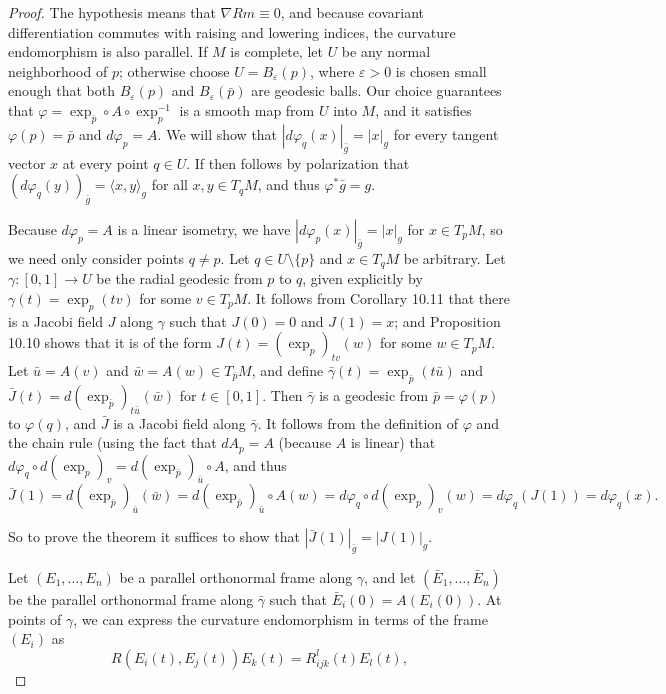 \begin{proof}
The hypothesis means that $\nabla Rm \equiv 0$, and because covariant differentiation commutes with raising and lowering indices, the curvature endomorphism is also parallel. If $M$ is complete, let $U$ be any normal neighborhood of $p$; otherwise choose $U = B_\varepsilon(p)$, where $\varepsilon > 0$ is chosen small enough that both $B_\varepsilon(p)$ and $B_\varepsilon(\bar{p})$ are geodesic balls. Our choice guarantees that $\varphi = \exp_{\bar{p}} \circ A \circ \exp_p^{-1}$ is a smooth map from $U$ into $M$, and it satisfies $\varphi(p) = \bar{p}$ and $d\varphi_p = A$. We will show that $|d\varphi_q(x)|_{\bar{g}} = |x|_g$ for every tangent vector $x$ at every point $q \in U$. If then follows by polarization that $(d\varphi_q(y))_{\bar{g}} = \langle x, y \rangle_g$ for all $x, y \in T_q M$, and thus $\varphi^* \bar{g} = g$.

Because $d\varphi_p = A$ is a linear isometry, we have $|d\varphi_p(x)|_{\bar{g}} = |x|_g$ for $x \in T_p M$, so we need only consider points $q \neq p$. Let $q \in U \setminus \{p\}$ and $x \in T_q M$ be arbitrary. Let $\gamma : [0, 1] \to U$ be the radial geodesic from $p$ to $q$, given explicitly by $\gamma(t) = \exp_p(tv)$ for some $v \in T_p M$. It follows from Corollary 10.11 that there is a Jacobi field $J$ along $\gamma$ such that $J(0) = 0$ and $J(1) = x$; and Proposition 10.10 shows that it is of the form $J(t) = (\exp_p)_{tv}(w)$ for some $w \in T_p M$. Let $\bar{u} = A(v)$ and $\bar{w} = A(w) \in T_{\bar{p}} M$, and define $\bar{\gamma}(t) = \exp_{\bar{p}}(t\bar{u})$ and $\bar{J}(t) = d(\exp_{\bar{p}})_{t\bar{u}}(\bar{w})$ for $t \in [0, 1]$. Then $\bar{\gamma}$ is a geodesic from $\bar{p} = \varphi(p)$ to $\varphi(q)$, and $\bar{J}$ is a Jacobi field along $\bar{\gamma}$. It follows from the definition of $\varphi$ and the chain rule (using the fact that $dA_p = A$ (because $A$ is linear) that $d\varphi_q \circ d(\exp_p)_v = d(\exp_{\bar{p}})_{\bar{u}} \circ A$, and thus
\[
\bar{J}(1) = d(\exp_{\bar{p}})_{\bar{u}}(\bar{w}) = d(\exp_{\bar{p}})_{\bar{u}} \circ A(w) = d\varphi_q \circ d(\exp_p)_v(w) = d\varphi_q(J(1)) = d\varphi_q(x).
\]

So to prove the theorem it suffices to show that $|\bar{J}(1)|_{\bar{g}} = |J(1)|_g$.

Let $(E_1,\ldots,E_n)$ be a parallel orthonormal frame along $\gamma$, and let $(\bar{E}_1,\ldots,\bar{E}_n)$ be the parallel orthonormal frame along $\bar{\gamma}$ such that $\bar{E}_i(0) = A(E_i(0))$. At points of $\gamma$, we can express the curvature endomorphism in terms of the frame $(E_i)$ as
\[
R(E_i(t), E_j(t))E_k(t) = R_{ijk}^l(t) E_l(t),
\]


\end{proof}
